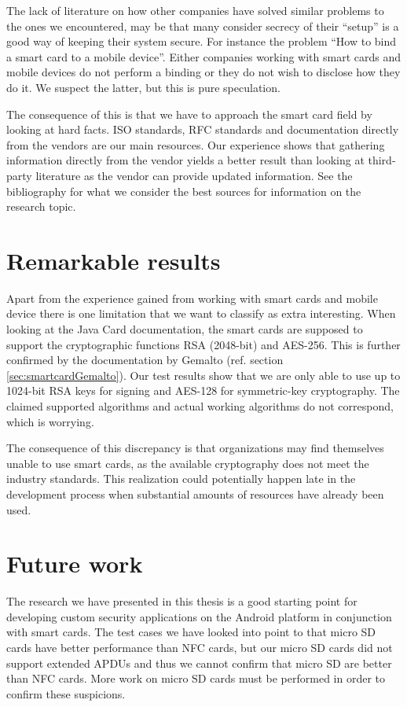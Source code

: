 The lack of literature on how other companies have solved similar problems to the ones we encountered, may be that many consider secrecy of their ``setup'' is a good way of keeping their system secure. For instance the problem ``How to bind a smart card to a mobile device''. Either companies working with smart cards and mobile devices do not perform a binding or they do not wish to disclose how they do it. We suspect the latter, but this is pure speculation.

The consequence of this is that we have to approach the smart card field by looking at hard facts. ISO standards, RFC standards and documentation directly from the vendors are our main resources. Our experience shows that gathering information directly from the vendor yields a better result than looking at third-party literature as the vendor can provide updated information. See the bibliography for what we consider the best sources for information on the research topic.

\section{Remarkable results}
Apart from the experience gained from working with smart cards and mobile device there is one limitation that we want to classify as extra interesting. When looking at the Java Card documentation, the smart cards are supposed to support the cryptographic functions RSA (2048-bit) and AES-256. This is further confirmed by the documentation by Gemalto (ref. section \ref{sec:smartcardGemalto}). Our test results show that we are only able to use up to 1024-bit RSA keys for signing and AES-128 for symmetric-key cryptography. The claimed supported algorithms and actual working algorithms do not correspond, which is worrying.

The consequence of this discrepancy is that organizations may find themselves unable to use smart cards, as the available cryptography does not meet the industry standards. This realization could potentially happen late in the development process when substantial amounts of resources have already been used.

\section{Future work}
\label{sec:future}
The research we have presented in this thesis is a good starting point for developing custom security applications on the Android platform in conjunction with smart cards. The test cases we have looked into point to that micro SD cards have better performance than NFC cards, but our micro SD cards did not support extended APDUs and thus we cannot confirm that micro SD are better than NFC cards. More work on micro SD cards must be performed in order to confirm these suspicions.

